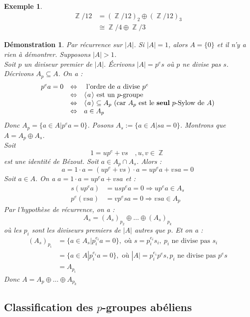 \documentclass[a4paper, oneside]{report}
\theoremstyle{break}
\newtheorem{exem}[thm]{Exemple}
\newtheorem*{demo}{Démonstration}
\DeclareMathOperator{\Z}{\mathbb{Z}}
\newcommand{\pro}[1]{\langle\hspace{0.1em}#1\hspace{0.1em}\rangle}
\newcommand{\gen}{\pro}
\begin{document}
\begin{exem}
\begin{align*}
\Z/12 &= (\Z/12)_2\oplus (\Z/12)_3\\
&\cong \Z/4 \oplus \Z/3
\end{align*}
\end{exem}

\begin{demo}
Par récurrence sur $|A|$. Si $|A|=1$, alors $A=\{0\}$ et il n'y a rien à démontrer. Supposons $|A| >1$.\\
Soit $p$ un diviseur premier de $|A|$. Écrivons $|A| = p^es$ où $p$ ne divise pas $s$.\\
Décrivons $A_p \subseteq A$. On a :
$$\begin{array}{lll}
p^e a = 0 &\Leftrightarrow & \text{ l'ordre de } a \text{ divise } p^e\\
&\Leftrightarrow & \gen{a} \text{ est un }p\text{-groupe}\\
&\Leftrightarrow & \gen{a}\subseteq A_p ~(\text{car }A_p\text{ est le \textbf{seul} }p\text{-Sylow de }A)\\
&\Leftrightarrow &a\in A_p
\end{array}$$
Donc $A_p = \{a\in A| p^ea = 0 \}$. Posons $A_s := \{a\in A | sa=0\}$. Montrons que $A=A_p \oplus A_s$.\\
Soit 
$$1=up^e+vs\quad, u,v \in \Z$$
est une identité de Bézout. Soit $a \in A_p \cap A_s$. Alors :
$$a=1\cdot a = (up^e+vs)\cdot a = up^ea+vsa= 0$$
Soit $a\in A$. On a $a=1\cdot a= up^ea+vsa$ et :
\begin{align*}
s(up^ea)&=usp^ea=0\Rightarrow up^ea \in A_s\\
p^e(vsa)&=vp^esa=0\Rightarrow vsa \in A_p
\end{align*}
Par l'hypothèse de récurrence, on a :
$$A_s = (A_s)_{p_2} \oplus \ldots \oplus (A_s)_{p_k}$$
où les $p_i$ sont les diviseurs premiers de $|A|$ autres que $p$. Et on a :
\begin{align*}
(A_s)_{p_i}&=\{a\in A_s | p_i^{e_i}a=0 \}, \text{ où } s=p_i^{e_i}s_i,~p_i\text{ ne divise pas } s_i\\
&=\{a\in A | p_i^{e_i}a=0 \}, \text{ où } |A| = p_i^{e_i}p^es, p_i \text{ ne divise pas }p^e s \\
&= A_{p_i}
\end{align*}
Donc $A=A_p\oplus \ldots \oplus A_{p_k}$
\end{demo}

\subsection{Classification des $p$-groupes abéliens}
\end{document}
